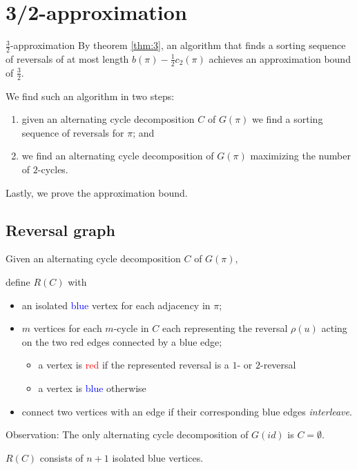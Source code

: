 \documentclass{beamer}
\theoremstyle{definition}
\def\spadding{\vspace{0.25cm}}
\def\b{\textcolor{blue}}
\def\r{\textcolor{red}}
\begin{document}
\section{3/2-approximation}

\begin{frame}

\begin{block}{$\frac{3}{2}$-approximation}
By theorem \ref{thm:3}, an algorithm that finds a sorting sequence of reversals of at most length $b(\pi) - \frac{1}{2} c_2(\pi)$ achieves an approximation bound of $\frac{3}{2}$. \pause\spadding

We find such an algorithm in two steps:
\begin{enumerate}
    \item given an alternating cycle decomposition $C$ of $G(\pi)$ we find a sorting sequence of reversals for $\pi$\pause; and
    \item we find an alternating cycle decomposition of $G(\pi)$ maximizing the number of $2$-cycles.
\end{enumerate}
\end{block}\pause

Lastly, we prove the approximation bound.

\end{frame}

\subsection{Reversal graph}

\begin{frame}

\begin{definition}
Given an alternating cycle decomposition $C$ of $G(\pi)$, \par\pause
define $R(C)$ with
\begin{itemize}
    \item an isolated \b{blue} vertex for each adjacency in $\pi$\pause;
    \item $m$ vertices for each $m$-cycle in $C$ each representing the reversal $\rho(u)$ acting on the two red edges connected by a blue edge\pause;
    \begin{itemize}
        \item a vertex is \r{red} if the represented reversal is a $1$- or $2$-reversal
        \item a vertex is \b{blue} otherwise
    \end{itemize}\pause
    \item connect two vertices with an edge if their corresponding blue edges \textit{interleave}.
\end{itemize}
\end{definition}\pause

Observation: The only alternating cycle decomposition of $G(id)$ is $C = \emptyset$.\pause

\begin{corollary}
$R(C)$ consists of $n+1$ isolated blue vertices.
\end{corollary}

\end{frame}
\end{document}
